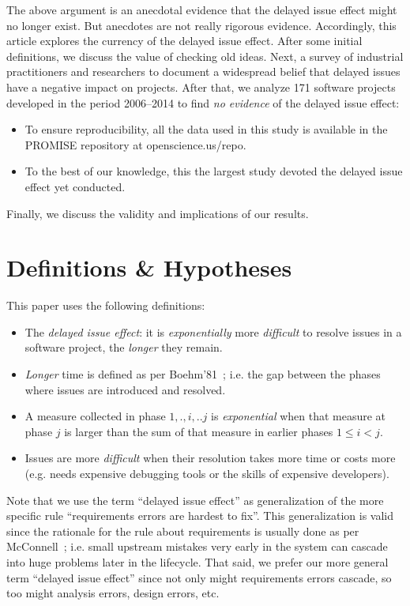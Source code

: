 \documentclass[smallcondesed]{svjour3}
\newcommand{\bi}{\begin{itemize}}%
\newcommand{\ei}{\end{itemize}}
\begin{document}
The above argument is an anecdotal evidence that  the delayed issue effect might no longer exist. But anecdotes are not really rigorous
evidence. Accordingly,  this article explores the currency of the delayed issue effect.
After some initial definitions, we discuss the
value of checking old ideas. Next, a survey of industrial practitioners and researchers to document a widespread belief that delayed issues have a negative impact on projects.  After that, we  analyze 171 software  projects developed in the period 2006--2014 to find  {\em no evidence} of the delayed issue effect:
\bi
\item
To ensure reproducibility,
all the data  used in this study is available in the PROMISE
repository at openscience.us/repo. 
\item
To the best of our knowledge,
this the largest study devoted the delayed issue effect yet conducted.
\ei
Finally, we discuss the validity and implications of our results.
 
\section{Definitions \& Hypotheses}
This paper uses the following definitions:
\bi
\item
The {\em delayed issue effect}:   it is {\em exponentially}  more {\em difficult} to resolve  issues in a software project, the {\em longer} they remain.
\item
 {\em Longer} time is defined as per  Boehm'81~\cite{Boehm81}; i.e. the gap between the   phases where   issues are introduced and resolved.
\item
A measure collected in phase ${1,.,i,..j}$ is 
{\em exponential} when  that
   measure at phase $j$   
   is larger than the sum of that measure in 
earlier phases $1 \le i < j$. 
\item
Issues are more {\em difficult}  
when their resolution takes more time or costs more  (e.g. needs expensive
debugging tools or the skills of expensive developers).
\ei
Note that we use  the  term ``delayed issue effect'' as generalization of the
more specific rule  ``requirements errors are hardest to fix''.
This generalization is valid since the rationale for the rule about requirements
is usually done as per McConnell~\cite{mcconnell01}; i.e. small upstream mistakes very
early in the system can cascade into huge problems later in the lifecycle.
That said, we prefer our more general term ``delayed issue effect'' since not
only might requirements errors cascade, so too might analysis errors, design errors, etc.
\end{document}
